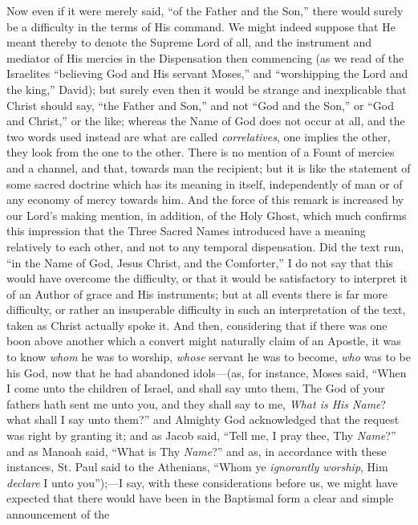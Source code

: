 Now even if it were merely said, ``of the Father and the
Son,'' there would surely be a difficulty in the terms of His
command. We might indeed suppose that He meant thereby to denote the
Supreme Lord of all, and the instrument and mediator of His mercies in
the Dispensation then commencing (as we read of the Israelites
``believing God and His servant Moses,'' and ``worshipping
the Lord and the king,'' David); but surely even then it would be
strange and inexplicable that Christ should say, ``the Father and
Son,'' and not ``God and the Son,'' or ``God and
Christ,'' or the like; whereas the Name of God does not occur at
all, and the two words used instead are what are called \emph{correlatives},
one implies the other, they look from the one to the other. There is
no mention of a Fount of mercies and a channel, and that, towards man
the recipient; but it is like the statement of some sacred doctrine
which has its meaning in itself, independently of man or of any
economy of mercy towards him. And the force of this remark is
increased by our Lord's making mention, in addition, of the Holy
Ghost, which much confirms this impression that the Three Sacred Names
introduced have a meaning relatively to each other, and not to any
temporal dispensation. Did the text run, ``in the Name of God,
Jesus Christ, and the Comforter,'' I do not say that this would
have overcome the difficulty, or that it would be satisfactory to
interpret it of an Author of grace and His instruments; but at all
events there is far more difficulty, or rather an insuperable
difficulty in such an interpretation of the text, taken as Christ
actually spoke it. And then, considering that if there was one boon
above another which a convert might naturally claim of an Apostle, it
was to know \emph{whom} he was to worship, \emph{whose} servant he was
to become, \emph{who} was to be his God, now that he had abandoned
idols—(as, for instance, Moses said, ``When I come unto the
children of Israel, and shall say unto them, The God of your fathers
hath sent me unto you, and they shall say to me, \emph{What is His Name}?
what shall I say unto them?'' and Almighty God acknowledged that
the request was right by granting it; and as Jacob said, ``Tell
me, I pray thee, Thy \emph{Name}?'' and as Manoah said, ``What
is Thy \emph{Name}?'' and as, in accordance with these instances,
St. Paul said to the Athenians, ``Whom ye \emph{ignorantly worship},
Him \emph{declare} I unto you'');—I say, with these
considerations before us, we might have expected that there would have
been in the Baptismal form a clear and simple announcement of the
